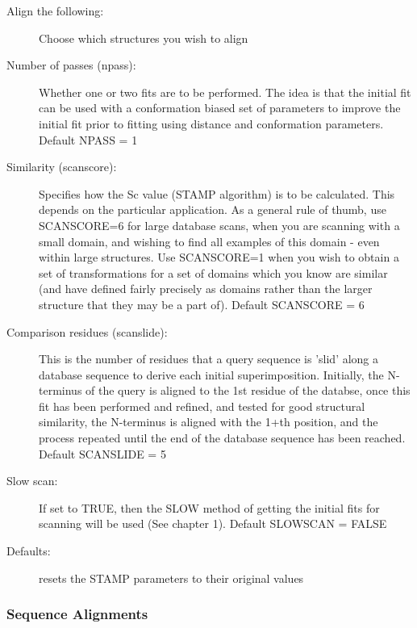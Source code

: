\begin{description}     
      \item [Align the following:] Choose which structures you wish to
      align
      \item [Number of passes (npass):] Whether one or two fits are to
      be performed. The idea is that the initial fit can be used with a
      conformation biased set of parameters to improve the initial fit
      prior to fitting using distance and conformation parameters.
      Default NPASS = 1
      \item [Similarity (scanscore):] Specifies how the Sc value (STAMP
      algorithm) is to be calculated. This depends on the particular
      application. As a general rule of thumb, use SCANSCORE=6 for large
      database scans, when you are scanning with a small domain, and
      wishing to find all examples of this domain - even within large
      structures. Use SCANSCORE=1 when you wish to obtain a set of
      transformations for a set of domains which you know are similar
      (and have defined fairly precisely as domains rather than the
      larger structure that they may be a part of). Default SCANSCORE =
      6
      \item [Comparison residues (scanslide):] This is the number of
      residues that a query sequence is 'slid' along a database sequence
      to derive each initial superimposition. Initially, the N-terminus
      of the query is aligned to the 1st residue of the databse, once
      this fit has been performed and refined, and tested for good
      structural similarity, the N-terminus is aligned with the 1+th
      position, and the process repeated until the end of the database
      sequence has been reached. Default SCANSLIDE = 5
      \item [Slow scan:] If set to TRUE, then the SLOW method of getting
      the initial fits for scanning will be used (See chapter 1).
      Default SLOWSCAN = FALSE
      \item [Defaults:] resets the STAMP parameters to their original values
\end{description}



\subsubsection {Sequence Alignments}


